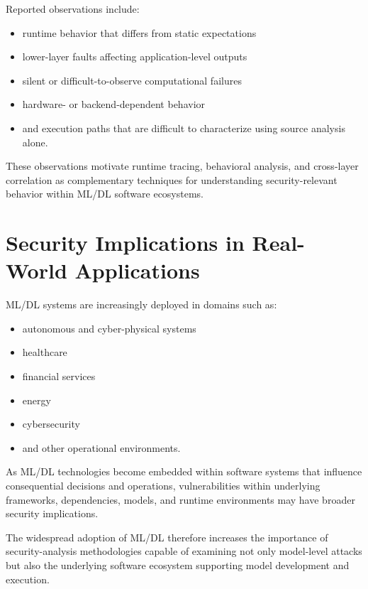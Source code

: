 \documentclass[
  12pt,
  letterpaper,
  oneside]{report}
\providecommand{\tightlist}{%
  \setlength{\itemsep}{0pt}\setlength{\parskip}{0pt}}
\begin{document}
Reported observations include:

\begin{itemize}
\tightlist
\item
  runtime behavior that differs from static expectations
\item
  lower-layer faults affecting application-level outputs
\item
  silent or difficult-to-observe computational failures
\item
  hardware- or backend-dependent behavior
\item
  and execution paths that are difficult to characterize using source
  analysis alone.
\end{itemize}

These observations motivate runtime tracing, behavioral analysis, and
cross-layer correlation as complementary techniques for understanding
security-relevant behavior within ML/DL software ecosystems.
\cite{jia2021symptoms,tambon2023silent}

\section{Security Implications in Real-World Applications}\label{88-security-implications-in-real-world-applications}

ML/DL systems are increasingly deployed in domains such as:

\begin{itemize}
\tightlist
\item
  autonomous and cyber-physical systems
\item
  healthcare
\item
  financial services
\item
  energy
\item
  cybersecurity
\item
  and other operational environments.
\end{itemize}

As ML/DL technologies become embedded within software systems that
influence consequential decisions and operations, vulnerabilities within
underlying frameworks, dependencies, models, and runtime environments
may have broader security implications.

The widespread adoption of ML/DL therefore increases the importance of
security-analysis methodologies capable of examining not only
model-level attacks but also the underlying software ecosystem
supporting model development and execution.
\cite{lai2025security,tan2026securing,meiklejohn2025modelsupplychain}
\end{document}
